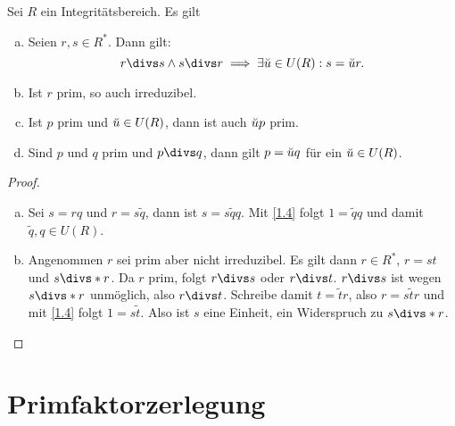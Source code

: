 \begin{lem} \label{1.5}
	Sei $R$ ein Integritätsbereich. Es gilt
	\begin{enumerate}[a)]
		\item
			Seien $r, s \in R^*$.
			Dann gilt:
			\[
				r\divs s  \land  s\divs r
				\implies
				\exists \unit u \in U(R) : s = \unit u r.
			\]
		\item
			Ist $r$ prim, so auch irreduzibel.
		\item
			Ist $p$ prim und $\breve{u} \in U(R)$, dann ist auch $\breve{u} p$ prim.
		\item
			Sind $p$ und $q$ prim und $p \divs  q$, dann gilt $p = \breve{u} q$ für ein $\breve{u} \in U(R)$.
	\end{enumerate}
	\begin{proof}
		\begin{enumerate}[a)]
			\item
				Sei $s = rq$ und $r = s\tilde q$, dann ist $s = s \tilde q q$.
				Mit \ref{1.4} folgt $1 = \tilde q q$ und damit $\tilde q, q \in U(R)$.
			\item
				Angenommen $r$ sei prim aber nicht irreduzibel.
				Es gilt dann $r \in R^*$, $r = st$ und $s \divs*  r$.
				Da $r$ prim, folgt $r \divs  s$ oder $r \divs  t$.
				$r \divs  s$ ist wegen $s \divs*  r$ unmöglich, also $r \divs  t$.
				Schreibe damit $t = \tilde t r$, also $r = s \tilde t r$ und mit \ref{1.4} folgt $1 = s \tilde t$.
				Also ist $s$ eine Einheit, ein Widerspruch zu $s \divs* r$.
		\end{enumerate}
	\end{proof}
\end{lem}

\section{Primfaktorzerlegung}

